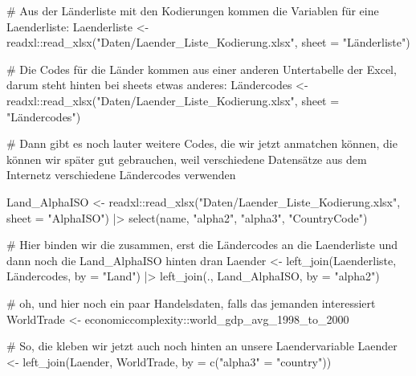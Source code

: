 \documentclass[twoside, pagesize, fontsize=11pt, dvipsnames]{scrreport}
\newenvironment{Shaded}{\begin{snugshade}}{\end{snugshade}}
\newcommand{\AttributeTok}[1]{\textcolor[rgb]{0.40,0.45,0.13}{#1}}
\newcommand{\CommentTok}[1]{\textcolor[rgb]{0.37,0.37,0.37}{#1}}
\newcommand{\FunctionTok}[1]{\textcolor[rgb]{0.28,0.35,0.67}{#1}}
\newcommand{\NormalTok}[1]{\textcolor[rgb]{0.00,0.23,0.31}{#1}}
\newcommand{\OtherTok}[1]{\textcolor[rgb]{0.00,0.23,0.31}{#1}}
\newcommand{\SpecialCharTok}[1]{\textcolor[rgb]{0.37,0.37,0.37}{#1}}
\newcommand{\StringTok}[1]{\textcolor[rgb]{0.13,0.47,0.30}{#1}}
\begin{document}
\begin{Shaded}
\begin{Highlighting}[]
\CommentTok{\# Aus der Länderliste mit den Kodierungen kommen die Variablen für eine Laenderliste:}
\NormalTok{Laenderliste }\OtherTok{\textless{}{-}}\NormalTok{ readxl}\SpecialCharTok{::}\FunctionTok{read\_xlsx}\NormalTok{(}\StringTok{"Daten/Laender\_Liste\_Kodierung.xlsx"}\NormalTok{, }\AttributeTok{sheet =} \StringTok{"Länderliste"}\NormalTok{)}

\CommentTok{\# Die Codes für die Länder kommen aus einer anderen Untertabelle der Excel, darum steht hinten bei sheets etwas anderes:}
\NormalTok{Ländercodes }\OtherTok{\textless{}{-}}\NormalTok{ readxl}\SpecialCharTok{::}\FunctionTok{read\_xlsx}\NormalTok{(}\StringTok{"Daten/Laender\_Liste\_Kodierung.xlsx"}\NormalTok{, }\AttributeTok{sheet =} \StringTok{"Ländercodes"}\NormalTok{)}

\CommentTok{\# Dann gibt es noch lauter weitere Codes, die wir jetzt anmatchen können, die können wir später gut gebrauchen, weil verschiedene Datensätze aus dem Internetz verschiedene Ländercodes verwenden}

\NormalTok{Land\_AlphaISO }\OtherTok{\textless{}{-}}\NormalTok{ readxl}\SpecialCharTok{::}\FunctionTok{read\_xlsx}\NormalTok{(}\StringTok{"Daten/Laender\_Liste\_Kodierung.xlsx"}\NormalTok{, }\AttributeTok{sheet =} \StringTok{"AlphaISO"}\NormalTok{) }\SpecialCharTok{|\textgreater{}} 
  \FunctionTok{select}\NormalTok{(name, }\StringTok{"alpha2"}\NormalTok{, }\StringTok{"alpha3"}\NormalTok{, }\StringTok{"CountryCode"}\NormalTok{)}

\CommentTok{\# Hier binden wir die zusammen, erst die Ländercodes an die Laenderliste und dann noch die Land\_AlphaISO hinten dran}
\NormalTok{Laender }\OtherTok{\textless{}{-}} \FunctionTok{left\_join}\NormalTok{(Laenderliste, Ländercodes, }\AttributeTok{by =} \StringTok{"Land"}\NormalTok{) }\SpecialCharTok{|\textgreater{}} 
  \FunctionTok{left\_join}\NormalTok{(., Land\_AlphaISO, }\AttributeTok{by =} \StringTok{"alpha2"}\NormalTok{)}

\CommentTok{\# oh, und hier noch ein paar Handelsdaten, falls das jemanden interessiert}
\NormalTok{WorldTrade }\OtherTok{\textless{}{-}}\NormalTok{ economiccomplexity}\SpecialCharTok{::}\NormalTok{world\_gdp\_avg\_1998\_to\_2000}

\CommentTok{\# So, die kleben wir jetzt auch noch hinten an unsere Laendervariable}
\NormalTok{Laender }\OtherTok{\textless{}{-}} \FunctionTok{left\_join}\NormalTok{(Laender, WorldTrade, }\AttributeTok{by =} \FunctionTok{c}\NormalTok{(}\StringTok{"alpha3"} \OtherTok{=} \StringTok{"country"}\NormalTok{))}


\end{Highlighting}
\end{Shaded}
\end{document}
